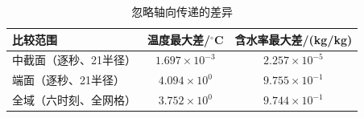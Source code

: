 \begin{table}[H]\centering\small
\caption{忽略轴向传递的差异}\label{tab:q2_dimension_errors}
\begin{tabular}{lcc}
\toprule
比较范围 & 温度最大差/$^\circ$C & 含水率最大差/(kg/kg)\\\midrule
中截面（逐秒、21半径） & $1.697\times10^{-3}$ & $2.257\times10^{-5}$\\
端面（逐秒、21半径） & $4.094\times10^{0}$ & $9.755\times10^{-1}$\\
全域（六时刻、全网格） & $3.752\times10^{0}$ & $9.744\times10^{-1}$\\
\bottomrule\end{tabular}\end{table}
